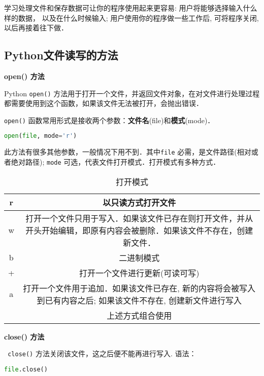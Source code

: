 
学习处理文件和保存数据可让你的程序使用起来更容易: 用户将能够选择输入什么样的数据， 以及在什么时候输入; 用户使用你的程序做一些工作后, 可将程序关闭, 以后再接着往下做．
\subsection{Python文件读写的方法}
\textbf{open() 方法}

Python \verb|open()| 方法用于打开一个文件，并返回文件对象，在对文件进行处理过程都需要使用到这个函数，如果该文件无法被打开，会抛出错误．


\verb|open()| 函数常用形式是接收两个参数：\textbf{文件名}(file)和\textbf{模式}(mode)．
\begin{lstlisting}[language=python]
open(file, mode='r')
\end{lstlisting}
此方法有很多其他参数，一般情况下用不到．其中\verb|file| 必需，是文件路径(相对或者绝对路径); \verb|mode| 可选，代表文件打开模式．打开模式有多种方式．
\begin{table}[ht]
\centering
\caption{打开模式}\label{PyFile_tab1}
\begin{tabular}{|c|c|}
\hline
r & 以只读方式打开文件 \\
\hline
w & 打开一个文件只用于写入．如果该文件已存在则打开文件，并从开头开始编辑，即原有内容会被删除．如果该文件不存在，创建新文件． \\
\hline
b & 二进制模式 \\
\hline
+ & 打开一个文件进行更新(可读可写) \\
\hline
a & 打开一个文件用于追加．如果该文件已存在, 新的内容将会被写入到已有内容之后; 如果该文件不存在, 创建新文件进行写入 \\
\hline
&上述方式组合使用   \\
\hline
\end{tabular}
\end{table}

\textbf{close() 方法}

\verb| close()| 方法关闭该文件，这之后便不能再进行写入. 语法：
\begin{lstlisting}[language=python]
file.close()
\end{lstlisting}

